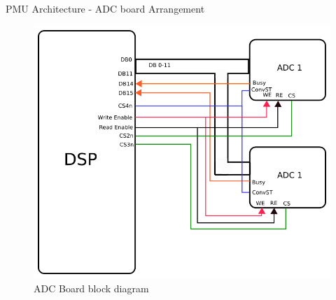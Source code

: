 \documentclass{beamer}
\begin{document}
\begin{frame}{PMU Architecture - ADC board Arrangement}
\begin{figure}
\includegraphics[scale= 0.4]{fig/ADC_board.png}
\caption{ADC Board block diagram}
\end{figure}
\end{frame}
\end{document}
